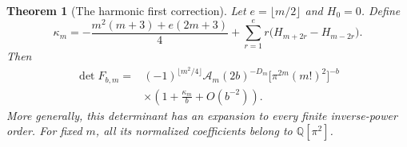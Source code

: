 \documentclass[11pt,a4paper]{article}
\numberwithin{equation}{section}
\newtheorem{theorem}{Theorem}[section]
\theoremstyle{definition}
\theoremstyle{remark}
\newcommand{\Q}{\mathbb Q}
\begin{document}
\begin{theorem}[The harmonic first correction]\label{gb:harmonic-correction}
Let $e=\lfloor m/2\rfloor$ and $H_0=0$.  Define
\begin{equation}\label{gb:kappa}
 \boxed{\displaystyle
 \kappa_m=-\frac{m^2(m+3)+e(2m+3)}4
       +\sum_{r=1}^{e}r\bigl(H_{m+2r}-H_{m-2r}\bigr).}
\end{equation}
Then
\begin{equation}\label{gb:det-first-correction}
\begin{split}
 \det F_{b,m}={}&(-1)^{\lfloor m^2/4\rfloor}\mathcal A_m
       (2b)^{-D_m}\bigl[\pi^{2m}(m!)^2\bigr]^{-b}\\
 &\times\left(1+\frac{\kappa_m}{b}+O(b^{-2})\right).
\end{split}
\end{equation}
More generally, this determinant has an expansion to every finite
inverse-power order.  For fixed $m$, all its normalized coefficients
belong to $\Q[\pi^2]$.
\end{theorem}
\end{document}
